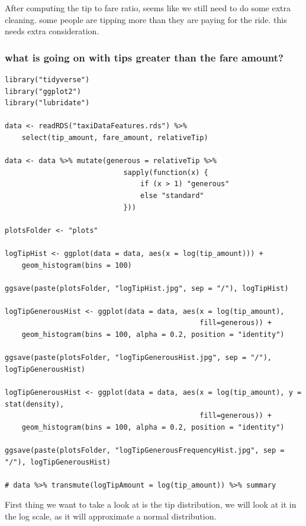 \documentclass[11pt]{article}
\begin{document}
After computing the tip to fare ratio, seems like we still need to do some extra cleaning.
some people are tipping more than they are paying for the ride. this needs extra consideration.


\subsubsection{what is going on with tips greater than the fare amount?}
\label{sec:org675b2ff}
\begin{verbatim}
library("tidyverse")
library("ggplot2")
library("lubridate")

data <- readRDS("taxiDataFeatures.rds") %>%
    select(tip_amount, fare_amount, relativeTip)

data <- data %>% mutate(generous = relativeTip %>%
                            sapply(function(x) {
                                if (x > 1) "generous"
                                else "standard"
                            }))

plotsFolder <- "plots"

logTipHist <- ggplot(data = data, aes(x = log(tip_amount))) +
    geom_histogram(bins = 100)

ggsave(paste(plotsFolder, "logTipHist.jpg", sep = "/"), logTipHist)

logTipGenerousHist <- ggplot(data = data, aes(x = log(tip_amount),
                                              fill=generous)) +
    geom_histogram(bins = 100, alpha = 0.2, position = "identity")

ggsave(paste(plotsFolder, "logTipGenerousHist.jpg", sep = "/"), logTipGenerousHist)

logTipGenerousHist <- ggplot(data = data, aes(x = log(tip_amount), y = stat(density),
                                              fill=generous)) +
    geom_histogram(bins = 100, alpha = 0.2, position = "identity")

ggsave(paste(plotsFolder, "logTipGenerousFrequencyHist.jpg", sep = "/"), logTipGenerousHist)

# data %>% transmute(logTipAmount = log(tip_amount)) %>% summary
\end{verbatim}
First thing we want to take a look at is the tip distribution, we will look
at it in the log scale, as it will approximate a normal distribution.
\end{document}
